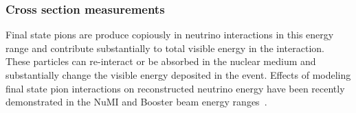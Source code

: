% 
%


\subsubsection{Cross section measurements}


Final state pions are produce copiously in neutrino interactions in this energy range 
and contribute substantially to total visible energy in the interaction.
These particles can re-interact or be absorbed in the nuclear medium
and substantially change the visible energy deposited in the event. 
Effects of modeling final state pion interactions on reconstructed neutrino energy have 
been recently demonstrated in the NuMI and Booster beam energy ranges~\cite{miniboonefsi, minervafsi}. 


